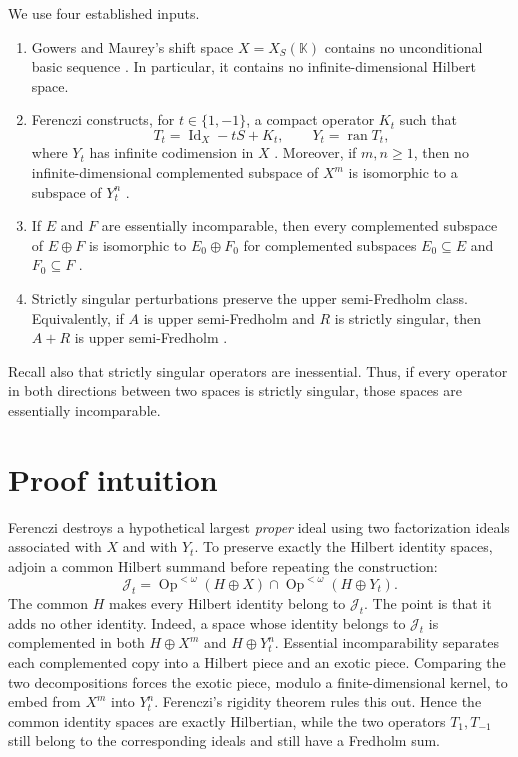 \documentclass[11pt]{article}
\newcommand{\Opp}{\operatorname{Op}^{<\omega}}
\newcommand{\Id}{\operatorname{Id}}
\newcommand{\ran}{\operatorname{ran}}
\newcommand{\cJ}{\mathcal J}
\begin{document}
We use four established inputs.
\begin{enumerate}[label=(\roman*)]
\item Gowers and Maurey's shift space $X=X_S(\mathbb K)$ contains no
unconditional basic sequence \cite[Section~5.2]{GM}. In particular, it
contains no infinite-dimensional Hilbert space.
\item Ferenczi constructs, for $t\in\{1,-1\}$, a compact operator $K_t$ such
that
\[
 T_t=\Id_X-tS+K_t,\qquad Y_t=\ran T_t,
\]
where $Y_t$ has infinite codimension in $X$ \cite[Section~4]{Ferenczi}.
Moreover, if $m,n\geq1$, then no infinite-dimensional complemented subspace
of $X^m$ is isomorphic to a subspace of $Y_t^n$ \cite[Proposition~4.4]{Ferenczi}.
\item If $E$ and $F$ are essentially incomparable, then every complemented
subspace of $E\oplus F$ is isomorphic to $E_0\oplus F_0$ for complemented
subspaces $E_0\subseteq E$ and $F_0\subseteq F$ \cite{Gonzalez}.
\item Strictly singular perturbations preserve the upper semi-Fredholm
class. Equivalently, if $A$ is upper semi-Fredholm and $R$ is strictly
singular, then $A+R$ is upper semi-Fredholm \cite[Chapter~2]{LT}.
\end{enumerate}

Recall also that strictly singular operators are inessential. Thus, if every
operator in both directions between two spaces is strictly singular, those
spaces are essentially incomparable.

\section{Proof intuition}

Ferenczi destroys a hypothetical largest \emph{proper} ideal using two
factorization ideals associated with $X$ and with $Y_t$. To preserve exactly
the Hilbert identity spaces, adjoin a common Hilbert summand before repeating
the construction:
\[
 \cJ_t=\Opp(H\oplus X)\cap\Opp(H\oplus Y_t).
\]
The common $H$ makes every Hilbert identity belong to $\cJ_t$. The point is
that it adds no other identity. Indeed, a space whose identity belongs to
$\cJ_t$ is complemented in both $H\oplus X^m$ and $H\oplus Y_t^n$.
Essential incomparability separates each complemented copy into a Hilbert
piece and an exotic piece. Comparing the two decompositions forces the exotic
piece, modulo a finite-dimensional kernel, to embed from $X^m$ into $Y_t^n$.
Ferenczi's rigidity theorem rules this out. Hence the common identity spaces
are exactly Hilbertian, while the two operators $T_1,T_{-1}$ still belong to
the corresponding ideals and still have a Fredholm sum.
\end{document}
